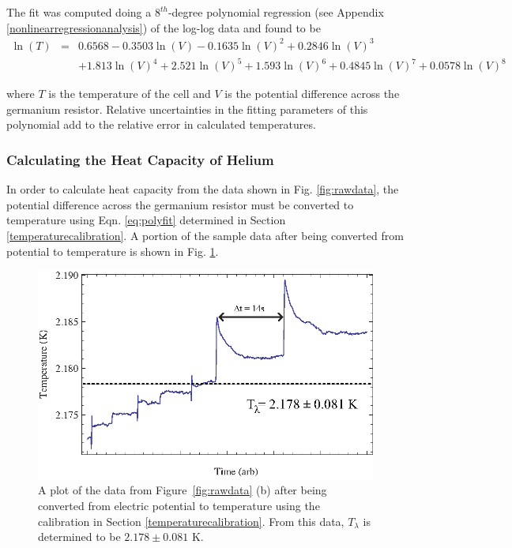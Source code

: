 The fit was computed doing a $8^{th}$-degree polynomial regression (see Appendix \ref{nonlinearregressionanalysis}) of the log-log data and found to be 
\begin{eqnarray}\label{eq:polyfit}
\ln(T) &=& 0.6568 - 0.3503\ln(V) - 0.1635\ln(V)^{2} + 0.2846\ln(V)^{3} \\
& & + 1.813\ln(V)^{4} + 2.521\ln(V)^{5} + 1.593\ln(V)^{6} + 0.4845\ln(V)^{7} + 0.0578\ln(V)^{8} \nonumber
\end{eqnarray}

where $T$ is the temperature of the cell and $V$ is the potential difference across the germanium resistor.  Relative uncertainties in the fitting parameters of this polynomial add to the relative error in calculated temperatures.   

\subsubsection{Calculating the Heat Capacity of Helium}\label{calculatingtheheatcapacityofthecell}

In order to calculate heat capacity from the data shown in Fig. \ref{fig:rawdata}, the potential difference across the germanium resistor must be converted to temperature using Eqn. \ref{eq:polyfit} determined in Section \ref{temperaturecalibration}. A portion of the sample data after being converted from potential to temperature is shown in Fig. \ref{fig:heatingdata}.  

\begin{figure}[htbp]
\begin{center}
\includegraphics[height=70mm]{./figures/heatingdata.eps}
\caption{\small{A plot of the data from Figure~\ref{fig:rawdata} (b) after being converted from electric potential to temperature using the calibration in Section \ref{temperaturecalibration}.  From this data, $T_{\lambda}$ is determined to be $2.178\pm0.081$ K.}}
\label{fig:heatingdata}
\end{center}
\end{figure}

